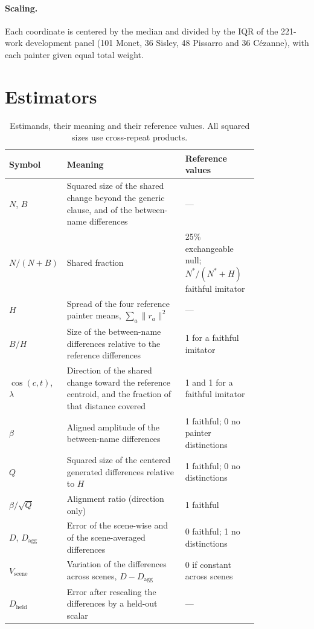 \paragraph{Scaling.} Each coordinate is centered by the median and divided by the IQR of the
221-work development panel (101 Monet, 36 Sisley, 48 Pissarro and 36 C\'ezanne), with each
painter given equal total weight.

\FloatBarrier
\section{Estimators}\label{app:estimators}

\begin{table}[ht]
\caption{Estimands, their meaning and their reference values. All squared sizes use
cross-repeat products.}
\label{tab:estimands}
\vspace{2pt}
\centering\small
\begin{tabular}{@{}lp{0.52\linewidth}p{0.3\linewidth}@{}}
\toprule
Symbol & Meaning & Reference values\\
\midrule
$N$, $B$ & Squared size of the shared change beyond the generic clause, and of the
between-name differences & ---\\
$N/(N+B)$ & Shared fraction & 25\% exchangeable null; $N^*/(N^*+H)$ faithful imitator\\
$H$ & Spread of the four reference painter means, $\sum_a\|r_a\|^2$ & ---\\
$B/H$ & Size of the between-name differences relative to the reference differences & 1 for a
faithful imitator\\
$\cos(c,t)$, $\lambda$ & Direction of the shared change toward the reference centroid, and the
fraction of that distance covered & 1 and 1 for a faithful imitator\\
$\beta$ & Aligned amplitude of the between-name differences & 1 faithful; 0 no painter
distinctions\\
$Q$ & Squared size of the centered generated differences relative to $H$ & 1 faithful; 0 no
distinctions\\
$\beta/\sqrt{Q}$ & Alignment ratio (direction only) & 1 faithful\\
$D$, $D_{\mathrm{agg}}$ & Error of the scene-wise and of the scene-averaged differences & 0
faithful; 1 no distinctions\\
$V_{\mathrm{scene}}$ & Variation of the differences across scenes, $D-D_{\mathrm{agg}}$ & 0 if
constant across scenes\\
$D_{\mathrm{held}}$ & Error after rescaling the differences by a held-out scalar & ---\\
\bottomrule
\end{tabular}
\end{table}

